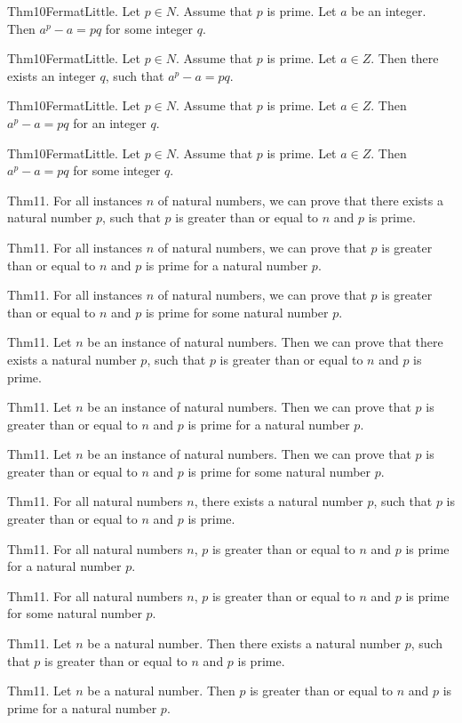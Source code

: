 \documentclass{article}
\begin{document}
Thm10FermatLittle. Let $p \in N$. Assume that $p$ is prime. Let $a$ be an integer. Then $a ^ {p}- a = p q$ for some integer $q$.

Thm10FermatLittle. Let $p \in N$. Assume that $p$ is prime. Let $a \in Z$. Then there exists an integer $q$, such that $a ^ {p}- a = p q$.

Thm10FermatLittle. Let $p \in N$. Assume that $p$ is prime. Let $a \in Z$. Then $a ^ {p}- a = p q$ for an integer $q$.

Thm10FermatLittle. Let $p \in N$. Assume that $p$ is prime. Let $a \in Z$. Then $a ^ {p}- a = p q$ for some integer $q$.

Thm11. For all instances $n$ of natural numbers, we can prove that there exists a natural number $p$, such that $p$ is greater than or equal to $n$ and $p$ is prime.

Thm11. For all instances $n$ of natural numbers, we can prove that $p$ is greater than or equal to $n$ and $p$ is prime for a natural number $p$.

Thm11. For all instances $n$ of natural numbers, we can prove that $p$ is greater than or equal to $n$ and $p$ is prime for some natural number $p$.

Thm11. Let $n$ be an instance of natural numbers. Then we can prove that there exists a natural number $p$, such that $p$ is greater than or equal to $n$ and $p$ is prime.

Thm11. Let $n$ be an instance of natural numbers. Then we can prove that $p$ is greater than or equal to $n$ and $p$ is prime for a natural number $p$.

Thm11. Let $n$ be an instance of natural numbers. Then we can prove that $p$ is greater than or equal to $n$ and $p$ is prime for some natural number $p$.

Thm11. For all natural numbers $n$, there exists a natural number $p$, such that $p$ is greater than or equal to $n$ and $p$ is prime.

Thm11. For all natural numbers $n$, $p$ is greater than or equal to $n$ and $p$ is prime for a natural number $p$.

Thm11. For all natural numbers $n$, $p$ is greater than or equal to $n$ and $p$ is prime for some natural number $p$.

Thm11. Let $n$ be a natural number. Then there exists a natural number $p$, such that $p$ is greater than or equal to $n$ and $p$ is prime.

Thm11. Let $n$ be a natural number. Then $p$ is greater than or equal to $n$ and $p$ is prime for a natural number $p$.
\end{document}
